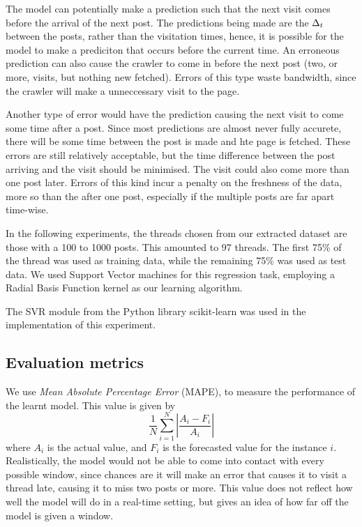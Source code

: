 \documentclass[12 pt]{article}
\begin{document}
The model can potentially make a prediction such that the next visit comes before the arrival of the next post. The predictions being made are the $\Delta_t$ between the posts, rather than the visitation times, hence, it is possible for the model to make a prediciton that occurs before the current time. An erroneous prediction can also cause the crawler to come in before the next post (two, or more, visits, but nothing new fetched). Errors of this type waste bandwidth, since the crawler will make a unneccessary visit to the page.

Another type of error would have the prediction causing the next visit to come some time after a post. Since most predictions are almost never fully accurete, there will be some time between the post is made and hte page is fetched. These errors are still relatively acceptable, but the time difference between the post arriving and the visit should be minimised. The visit could also come more than one post later. Errors of this kind incur a penalty on the freshness of the data, more so than the after one post, especially if the multiple posts are far apart time-wise.


In the following experiments, the threads chosen from our extracted dataset are those with a 100 to 1000 posts. This amounted to 97 threads. The first 75\% of the thread was used as training data, while the remaining 75\% was used as test data. We used Support Vector machines for this regression task, employing a Radial Basis Function kernel as our learning algorithm. 

The SVR module from the Python library scikit-learn was used in the implementation of this experiment.



\subsection{Evaluation metrics}
We use \emph{Mean Absolute Percentage Error} (MAPE), to measure the performance of the learnt model. This value is given by
\[
	\frac{1}{N}\sum^N_{i=1}\left|\frac{A_i-F_i}{A_i}\right|
\]
where $A_i$ is the actual value, and $F_i$ is the forecasted value for the instance $i$. Realistically, the model would not be able to come into contact with every possible window, since chances are it will make an error that causes %
it to visit a thread late, causing it to miss two posts or more. This value does not reflect how well the model will do in a real-time setting, but gives an idea of how far off the model is given a window. 
\end{document}
